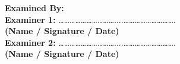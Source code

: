 \textbf{Examined By:}\\[0.3cm]
\hspace{1cm} \textbf{Examiner 1:} \hspace{0.2cm} …………………………....……………………….\\
\hspace{6cm} \textbf{(Name / Signature / Date)}\\[0.8cm]

\hspace{1cm} \textbf{Examiner 2:} \hspace{0.2cm} …………………………....……………………….\\
\hspace{6cm} \textbf{(Name / Signature / Date)}
